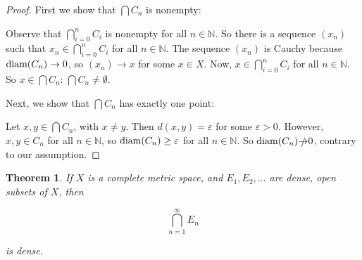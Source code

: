 \documentclass{amsart}
\newcommand{\vep}{\varepsilon}
\newcommand{\N}{\mathbb{N}}
\newcommand{\diam}{\text{\rm diam}}
\newtheorem{thm}{Theorem}[section]
\theoremstyle{definition}
\begin{document}
\begin{proof}
First we show that $\bigcap C_n$ is nonempty: 

Observe that $\bigcap\limits_{i=0}^n C_i$ is nonempty for all $n \in \N$. 
So there is a sequence $(x_n)$ such that $x_n \in \bigcap\limits_{i=0}^n C_i$ for all $n \in \N$. 
The sequence $(x_n)$ is Cauchy because $\diam(C_n) \to 0$, so $(x_n) \to x$ for some $x \in X$.
Now, $x \in \bigcap\limits_{i=0}^n C_i$ for all $n \in \N$.
So $x \in \bigcap C_n$: $\bigcap C_n \neq \emptyset$.

Next, we show that $\bigcap C_n$ has exactly one point:

Let $x, y \in \bigcap C_n$, with $x \neq y$. 
Then $d(x,y) = \vep$ for some $\vep >0$. 
However, $x,y \in C_n$ for all $n \in \N$,
so $\diam(C_n) \geq \vep$ for all $n \in \N$. 
So $\diam(C_n) \slashed{\to} 0$, contrary to our assumption.
\end{proof}

\begin{thm}If $X$ is a complete metric space, and $E_1, E_2, \ldots$ are dense, open subsets of $X$, then

\begin{displaymath}
\bigcap\limits_{n = 1}^{\infty} E_n
\end{displaymath}

is dense.
\end{thm}
\end{document}
